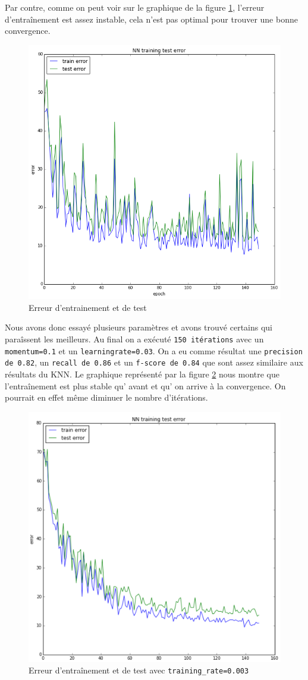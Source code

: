Par contre, comme on peut voir sur le graphique de la figure \ref{graph1}, l'erreur d'entraînement est assez instable, cela n'est pas optimal pour trouver une bonne convergence. 
\begin{figure}[h]
  \centering
    \includegraphics[width=0.6\linewidth]{img/graph3.png}
  \caption{Erreur d'entrainement et de test}
  \label{graph1}
\end{figure}
\newpage


Nous avons donc essayé plusieurs paramètres et avons trouvé certains qui paraîssent les meilleurs. Au final on a exécuté \texttt{150 itérations} avec un \texttt{momentum=0.1} et un \texttt{learningrate=0.03}. On a eu comme résultat une \texttt{precision de 0.82}, un \texttt{recall de 0.86} et un  \texttt{f-score de 0.84} que sont assez similaire aux résultats du KNN. Le graphique représenté par la figure \ref{graph003} nous montre que l'entraînement est plus stable qu' avant et qu' on arrive à la convergence. On pourrait en effet même diminuer le nombre d'itérations.

\begin{figure}[h]
  \centering
    \includegraphics[width=0.6\linewidth]{img/graph003.png}
  \caption{Erreur d'entraînement et de test avec \texttt{training\_rate=0.003}}
  \label{graph003}
\end{figure}
\newpage

